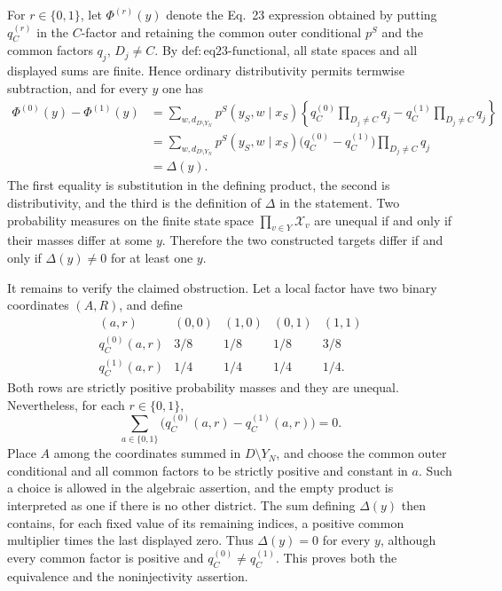 For \(r\in\{0,1\}\), let \(\Phi^{(r)}(y)\) denote the Eq.\ 23 expression obtained by putting \(q_C^{(r)}\) in the \(C\)-factor and retaining the common outer conditional \(p^S\) and the common factors \(q_j\), \(D_j\ne C\).  By \(\mathrm{def:eq23\text{-}functional}\), all state spaces and all displayed sums are finite.  Hence ordinary distributivity permits termwise subtraction, and for every \(y\) one has
\[
\begin{aligned}
 \Phi^{(0)}(y)-\Phi^{(1)}(y)
 &=\sum_{w,d_{D\setminus Y_N}}p^S(y_S,w\mid x_S)
 \left\{q_C^{(0)}\prod_{D_j\ne C}q_j-q_C^{(1)}\prod_{D_j\ne C}q_j\right\}\\
 &=\sum_{w,d_{D\setminus Y_N}}p^S(y_S,w\mid x_S)
 \bigl(q_C^{(0)}-q_C^{(1)}\bigr)\prod_{D_j\ne C}q_j\\
 &=\Delta(y).
\end{aligned}
\]
The first equality is substitution in the defining product, the second is distributivity, and the third is the definition of \(\Delta\) in the statement.  Two probability measures on the finite state space \(\prod_{v\in Y}\mathcal X_v\) are unequal if and only if their masses differ at some \(y\).  Therefore the two constructed targets differ if and only if \(\Delta(y)\ne0\) for at least one \(y\).

It remains to verify the claimed obstruction.  Let a local factor have two binary coordinates \((A,R)\), and define
\[
\begin{array}{c|cccc}
 (a,r)&(0,0)&(1,0)&(0,1)&(1,1)\\ \hline
 q_C^{(0)}(a,r)&3/8&1/8&1/8&3/8\\
 q_C^{(1)}(a,r)&1/4&1/4&1/4&1/4.
\end{array}
\]
Both rows are strictly positive probability masses and they are unequal.  Nevertheless, for each \(r\in\{0,1\}\),
\[
 \sum_{a\in\{0,1\}}\bigl(q_C^{(0)}(a,r)-q_C^{(1)}(a,r)\bigr)=0.
\]
Place \(A\) among the coordinates summed in \(D\setminus Y_N\), and choose the common outer conditional and all common factors to be strictly positive and constant in \(a\).  Such a choice is allowed in the algebraic assertion, and the empty product is interpreted as one if there is no other district.  The sum defining \(\Delta(y)\) then contains, for each fixed value of its remaining indices, a positive common multiplier times the last displayed zero.  Thus \(\Delta(y)=0\) for every \(y\), although every common factor is positive and \(q_C^{(0)}\ne q_C^{(1)}\).  This proves both the equivalence and the noninjectivity assertion.

